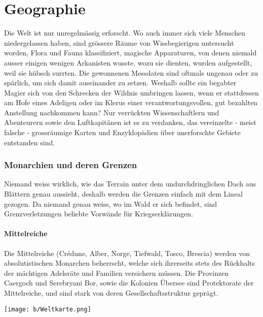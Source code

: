 \documentclass[10pt,twoside,twocolumn,openany]{book}
\begin{document}
 \section{Geographie}
\begin{multicols}{2}
	Die Welt ist nur unregelmässig erforscht. Wo auch immer sich viele Menschen niedergelassen haben, sind grössere Räume von Wissbegierigen untersucht worden, Flora und Fauna klassifiziert, magische Apparaturen, von denen niemald ausser einigen wenigen Arkanisten wusste, wozu sie dienten, wurden aufgestellt, weil sie hübsch surrten. Die gewonnenen Messdaten sind oftmals ungenau oder zu spärlich, um sich damit auseinander zu setzen. Weshalb sollte ein begabter Magier sich von den Schrecken der Wildnis umbringen lassen, wenn er stattdessen am Hofe eines Adeligen oder im Klerus einer verantwortungsvollen, gut bezahlten Anstellung nachkommen kann?
	Nur verrückten Wissenschaftlern und Abenteurern sowie den Luftkapitänen ist es zu verdanken, das vereinzelte - meist falsche - grossräumige Karten und Enzyklopädien über unerforschte Gebiete entstanden sind.
	
	\subsubsection{Monarchien und deren Grenzen}
	Niemand weiss wirklich, wie das Terrain unter dem undurchdringlichen Dach aus Blättern genau aussieht, deshalb werden die Grenzen einfach mit dem Lineal gezogen. Da niemand genau weiss, wo im Wald er sich befindet, sind Grenzverletzungen beliebte Vorwände für Kriegserklärungen.
	
	\paragraph{Mittelreiche}Die Mittelreiche (Crédune, Alber, Norge, Tiefwald, Tosco, Brescia) werden von absolutistischen Monarchen beherrscht, welche sich ihrerseits stets des Rückhalts der mächtigen Adelsräte und Familien versichern müssen. Die Provinzen Caergoch und Serebryani Bor, sowie die Kolonien Übersee sind Protektorate der Mittelreiche, und sind stark von deren Gesellschaftsstruktur geprägt.

\end{multicols}
\newpage
\texttt{[image: b/Weltkarte.png]}
\end{document}
